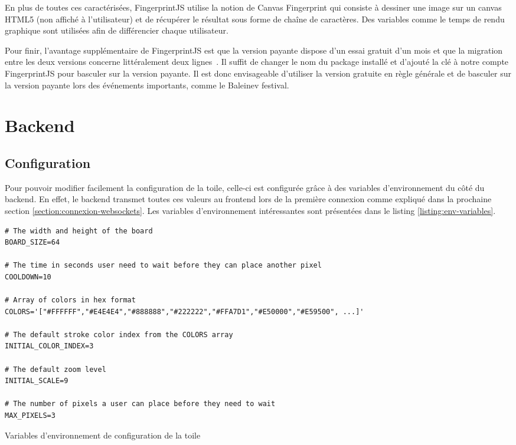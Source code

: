 En plus de toutes ces caractérisées, FingerprintJS utilise la notion de Canvas Fingerprint qui consiste à dessiner une image sur un canvas HTML5 (non affiché à l'utilisateur) et de récupérer le résultat sous forme de chaîne de caractères. Des variables comme le temps de rendu graphique sont utilisées afin de différencier chaque utilisateur.

Pour finir, l'avantage supplémentaire de FingerprintJS est que la version payante dispose d'un essai gratuit d'un mois et que la migration entre les deux versions concerne littéralement deux lignes~\cite{migratefingerprintjs}. Il suffit de changer le nom du package installé et d'ajouté la clé à notre compte FingerprintJS pour basculer sur la version payante. Il est donc envisageable d'utiliser la version gratuite en règle générale et de basculer sur la version payante lors des événements importants, comme le Baleinev festival.

\section{Backend}

\subsection{Configuration}

Pour pouvoir modifier facilement la configuration de la toile, celle-ci est configurée grâce à des variables d'environnement du côté du backend. En effet, le backend transmet toutes ces valeurs au frontend lors de la première connexion comme expliqué dans la prochaine section \ref{section:connexion-websockets}. Les variables d'environnement intéressantes sont présentées dans le listing \ref{listing:env-variables}.

\begin{listing}[H]
  \begin{verbatim}
# The width and height of the board
BOARD_SIZE=64

# The time in seconds user need to wait before they can place another pixel
COOLDOWN=10

# Array of colors in hex format
COLORS='["#FFFFFF","#E4E4E4","#888888","#222222","#FFA7D1","#E50000","#E59500", ...]'

# The default stroke color index from the COLORS array
INITIAL_COLOR_INDEX=3

# The default zoom level
INITIAL_SCALE=9

# The number of pixels a user can place before they need to wait
MAX_PIXELS=3
\end{verbatim}
  \caption{Variables d'environnement de configuration de la toile}
  \label{listing:env-variables}
\end{listing}

